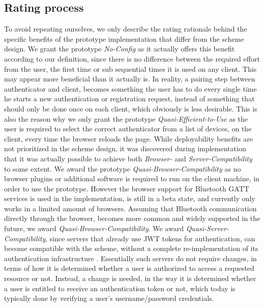 \subsection{Rating process}
To avoid repeating ourselves, we only describe the rating rationale behind the specific benefits of the prototype implementation that differ from the scheme design. 
We grant the prototype \textit{No-Config} as it actually offers this benefit according to our definition, since there is no difference between the required effort from the user, the first time or sub sequential times it is used on any client. This may appear more beneficial than it actually is. In reality, a pairing step between \gls{authenticator} and \gls{client}, becomes something the user has to do every single time he starts a new authentication or registration request, instead of something that should only be done once on each \gls{client}, which obviously is less desirable. This is also the reason why we only grant the prototype \textit{Quasi-Efficient-to-Use} as the user is required to select the correct \gls{authenticator} from a list of devices, on the \gls{client}, every time the browser reloads the page. 
While deployability benefits are not prioritized in the scheme design, it was discovered during implementation that it was actually possible to achieve both \textit{Browser-} and \textit{Server-Compatibility} to some extent. We award the prototype \textit{Quasi-Browser-Compatibility} as no browser plugins or additional software is required to run on the \gls{client} machine, in order to use the prototype. However the browser support for Bluetooth GATT services is used in the implementation, is still in a beta state, and currently only works in a limited amount of browsers. Assuming that Bluetooth communication directly through the browser, becomes more common and widely supported in the future, we award \textit{Quasi-Browser-Compatibility}.
We award \textit{Quasi-Server-Compatibility}, since servers that already use JWT tokens for authentication, can become compatible with the scheme, without a complete re-implementation of its authentication infrastructure . 
Essentially such servers do not require changes, in terms of how it is determined whether a user is authorized to access a requested resource or not. Instead, a change is needed, in the way it is determined whether a user is entitled to receive an authentication token or not, which today is typically done by verifying a user's username/password credentials. 